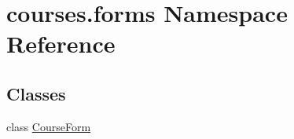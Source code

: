\hypertarget{namespacecourses_1_1forms}{}\section{courses.\+forms Namespace Reference}
\label{namespacecourses_1_1forms}
\subsection*{Classes}
\begin{DoxyCompactItemize}
\item 
class \hyperlink{classcourses_1_1forms_1_1CourseForm}{Course\+Form}
\end{DoxyCompactItemize}
